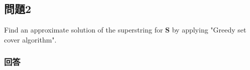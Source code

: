 \documentclass[a4j, uplatex, fleqn, dvipdfmx]{jsarticle} %
\begin{document}
\subsection{問題2}
Find an approximate solution of the superstring for $\bm{S}$
by applying "Greedy set cover algorithm".
\subsubsection{回答}




\end{document}
